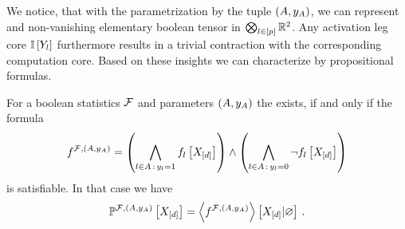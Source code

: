 We notice, that with the parametrization by the tuple $(A,y_{A})$, we can represent and non-vanishing elementary boolean tensor in $\bigotimes_{l\in[p]}\mathbb{R}^2$.
Any activation leg core $\mathbb{I}\left[Y_{l}\right]$ furthermore results in a trivial contraction with the corresponding computation core.
Based on these insights we can characterize \HardLogicNetworks{} by propositional formulas.

\begin{theorem}
    \label{the:hlnFormulaCharacterization}
    For a boolean statistics $\mathcal{F}$ and parameters $(A,y_{A})$ the \HardLogicNetwork{} exists, if and only if the formula
    \begin{align*}
        f^{\mathcal{F},(A,y_{A})} =
        \left(\bigwedge_{l\in A\,:\,y_{l}=1} f_{l}\left[X_{[d]}\right]\right)
        \land
        \left(\bigwedge_{l\in A\,:\,y_{l}=0} \lnot f_{l}\left[X_{[d]}\right]\right)
    \end{align*}
    is satisfiable.
    In that case we have
    \begin{align*}
        \mathbb{P}^{\mathcal{F},(A,y_{A})}\left[X_{[d]}\right]
        = \left\langle f^{\mathcal{F},(A,y_{A})}\right\rangle \left[ X_{[d]} | \varnothing \right] \, .
    \end{align*}
\end{theorem}

